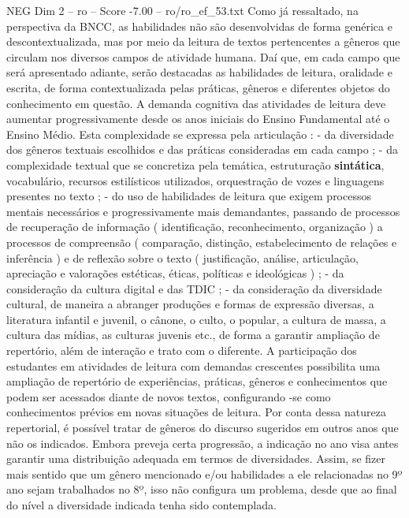 \begin{textsample}{NEG Dim 2 – ro – Score -7.00 – ro/ro\_ef\_53.txt}  \label{ex:f2_neg_101}
Como já ressaltado, na perspectiva da BNCC, as habilidades não são desenvolvidas de forma genérica e descontextualizada, mas por meio da leitura de textos pertencentes a gêneros que circulam nos diversos campos de atividade humana.
Daí que, em cada campo que será apresentado adiante, serão destacadas as habilidades de leitura, oralidade e escrita, de forma contextualizada pelas práticas, gêneros e diferentes objetos do conhecimento em questão.
A demanda cognitiva das atividades de leitura deve aumentar progressivamente desde os anos iniciais do Ensino Fundamental até o Ensino Médio.
Esta complexidade se expressa pela articulação : - da diversidade dos gêneros textuais escolhidos e das práticas consideradas em cada campo ; - da complexidade textual que se concretiza pela temática, estruturação \textbf{sintática}, vocabulário, recursos estilísticos utilizados, orquestração de vozes e linguagens presentes no texto ; - do uso de habilidades de leitura que exigem processos mentais necessários e progressivamente mais demandantes, passando de processos de recuperação de informação ( identificação, reconhecimento, organização ) a processos de compreensão ( comparação, distinção, estabelecimento de relações e inferência ) e de reflexão sobre o texto ( justificação, análise, articulação, apreciação e valorações estéticas, éticas, políticas e ideológicas ) ; - da consideração da cultura digital e das TDIC ; - da consideração da diversidade cultural, de maneira a abranger produções e formas de expressão diversas, a literatura infantil e juvenil, o cânone, o culto, o popular, a cultura de massa, a cultura das mídias, as culturas juvenis etc., de forma a garantir ampliação de repertório, além de interação e trato com o diferente.
A participação dos estudantes em atividades de leitura com demandas crescentes possibilita uma ampliação de repertório de experiências, práticas, gêneros e conhecimentos que podem ser acessados diante de novos textos, configurando -se como conhecimentos prévios em novas situações de leitura.
Por conta dessa natureza repertorial, é possível tratar de gêneros do discurso sugeridos em outros anos que não os indicados.
Embora preveja certa progressão, a indicação no ano visa antes garantir uma distribuição adequada em termos de diversidades.
Assim, se fizer mais sentido que um gênero mencionado e/ou habilidades a ele relacionadas no 9º ano sejam trabalhados no 8º, isso não configura um problema, desde que ao final do nível a diversidade indicada tenha sido contemplada.

\end{textsample}
